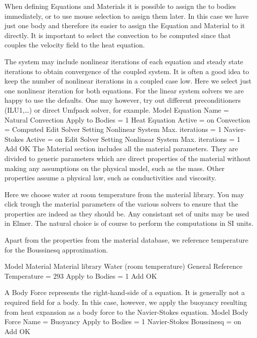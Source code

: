 When defining Equations and Materials it is possible to assign the to bodies immediately, or to use mouse
selection to assign them later. In this case we have just one body and therefore its easier to assign 
the Equation and Material to it directly.
It is important to select the 
convection to be computed since that couples the velocity field to the heat equation.

The system may include nonlinear iterations of each equation and steady state iterations 
to obtain convergence of the coupled system. It is often a good idea to keep the number of 
nonlinear iterations in a coupled case low. Here we select just one nonlinear iteration
for both equations.
For the linear system solvers we are happy to use the defaults. One may however, try out different
preconditioners (ILU1,\ldots) or direct Umfpack solver, for example.
\ttbegin
Model
  Equation
    Name = Natural Convection
    Apply to Bodies = 1
    Heat Equation
      Active = on
      Convection = Computed
      Edit Solver Setting
        Nonlinear System
          Max. iterations = 1
    Navier-Stokes 
      Active = on
      Edit Solver Setting
        Nonlinear System
          Max. iterations = 1
    Add 
    OK
\ttend        
The Material section includes all the material parameters.
They are divided to generic parameters which are direct properties of the material
without making any assumptions on the physical model, such as the mass. Other properties assume
a physical law, such as conductivities and viscosity. 

Here we choose water at room temperature from the material library.
You may click trough the material parameters of the various solvers to ensure that
the properties are indeed as they should be. Any consistant set of units may be used in Elmer.
The natural choice is of course to perform the computations in SI units. 

Apart from the properties from the material database, we
reference temperature for the Boussinesq approximation.    

\ttbegin
Model
  Material
    Material library    
      Water (room temperature)
    General 
      Reference Temperature = 293
    Apply to Bodies = 1 
    Add
    OK
\ttend

A Body Force represents the right-hand-side of a equation. It is generally 
not a required field for a body. In this case, however, we apply the buoyancy resulting from
heat expansion as a body force to the Navier-Stokes equation.
\ttbegin
Model
  Body Force
    Name = Buoyancy
    Apply to Bodies = 1
    Navier-Stokes
      Boussinesq = on
    Add 
    OK
\ttend    

